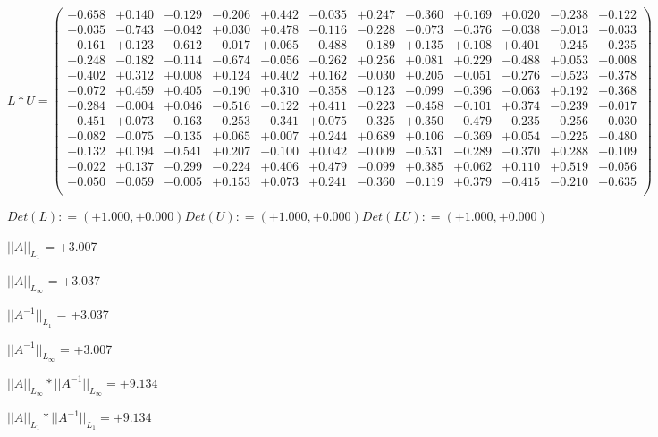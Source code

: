 \documentclass[9pt]{article}
\theoremstyle{plain}
\theoremstyle{definition}
\theoremstyle{remark}
\numberwithin{equation}{section}
\begin{document}
$L * U  = \left(
\begin{array}{
cccccccccccc}
-0.658 & +0.140 & -0.129 & -0.206 & +0.442 & -0.035 & +0.247 & -0.360 & +0.169 & +0.020 & -0.238 & -0.122 \\
+0.035 & -0.743 & -0.042 & +0.030 & +0.478 & -0.116 & -0.228 & -0.073 & -0.376 & -0.038 & -0.013 & -0.033 \\
+0.161 & +0.123 & -0.612 & -0.017 & +0.065 & -0.488 & -0.189 & +0.135 & +0.108 & +0.401 & -0.245 & +0.235 \\
+0.248 & -0.182 & -0.114 & -0.674 & -0.056 & -0.262 & +0.256 & +0.081 & +0.229 & -0.488 & +0.053 & -0.008 \\
+0.402 & +0.312 & +0.008 & +0.124 & +0.402 & +0.162 & -0.030 & +0.205 & -0.051 & -0.276 & -0.523 & -0.378 \\
+0.072 & +0.459 & +0.405 & -0.190 & +0.310 & -0.358 & -0.123 & -0.099 & -0.396 & -0.063 & +0.192 & +0.368 \\
+0.284 & -0.004 & +0.046 & -0.516 & -0.122 & +0.411 & -0.223 & -0.458 & -0.101 & +0.374 & -0.239 & +0.017 \\
-0.451 & +0.073 & -0.163 & -0.253 & -0.341 & +0.075 & -0.325 & +0.350 & -0.479 & -0.235 & -0.256 & -0.030 \\
+0.082 & -0.075 & -0.135 & +0.065 & +0.007 & +0.244 & +0.689 & +0.106 & -0.369 & +0.054 & -0.225 & +0.480 \\
+0.132 & +0.194 & -0.541 & +0.207 & -0.100 & +0.042 & -0.009 & -0.531 & -0.289 & -0.370 & +0.288 & -0.109 \\
-0.022 & +0.137 & -0.299 & -0.224 & +0.406 & +0.479 & -0.099 & +0.385 & +0.062 & +0.110 & +0.519 & +0.056 \\
-0.050 & -0.059 & -0.005 & +0.153 & +0.073 & +0.241 & -0.360 & -0.119 & +0.379 & -0.415 & -0.210 & +0.635 \\
\end{array}
\right)$ \newline 

$Det(L) :    = (+1.000,+0.000)     Det(U) :    = (+1.000,+0.000)     Det(LU) :    = (+1.000,+0.000)$

$||A||_{L_1}$  = +3.007

$||A||_{L_{\infty}}$ = +3.037

$||A^{-1}||_{L_1}$  = +3.037

$||A^{-1}||_{L_{\infty}}$ = +3.007

$||A||_{L_{\infty}} * ||A^{-1}||_{L_{\infty}} = +9.134$

$||A||_{L_1} * ||A^{-1}||_{L_1} = +9.134$
\end{document}
